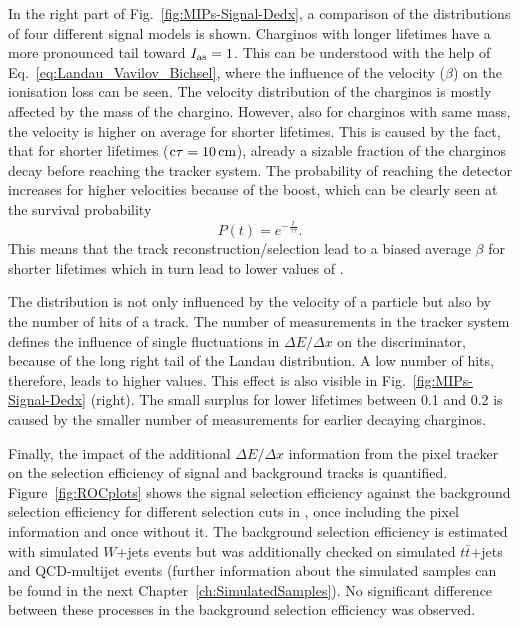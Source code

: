 In the right part of Fig.~\ref{fig:MIPs-Signal-Dedx}, a comparison of the \ias distributions of four different signal models is shown.
Charginos with longer lifetimes have a more pronounced tail toward $I_{\text{as}}=1$.
This can be understood with the help of Eq.~\eqref{eq:Landau_Vavilov_Bichsel}, where the influence of the velocity ($\beta$) on the ionisation loss can be seen.
The velocity distribution of the charginos is mostly affected by the mass of the chargino.
However, also for charginos with same mass, the velocity is higher on average for shorter lifetimes.
This is caused by the fact, that for shorter lifetimes (\eg $\text{c}\tau=10\,\text{cm}$), already a sizable fraction of the charginos decay before reaching the tracker system.
The probability of reaching the detector increases for higher velocities because of the boost, which can be clearly seen at the survival probability
\begin{equation}
P \left( t \right) = e^{-\frac{t}{\gamma \tau}}.
\end{equation} 
This means that the track reconstruction/selection lead to a biased average $\beta$ for shorter lifetimes which in turn lead to lower values of \ias.

The \ias distribution is not only influenced by the velocity of a particle but also by the number of hits of a track.
The number of measurements in the tracker system defines the influence of single fluctuations in $\Delta E/\Delta x$ on the \ias discriminator, because of the long right tail of the Landau distribution.
A low number of hits, therefore, leads to higher \ias values.
This effect is also visible in Fig.~\ref{fig:MIPs-Signal-Dedx} (right). 
The small surplus for lower lifetimes between 0.1 and 0.2 is caused by the smaller number of measurements for earlier decaying charginos.



Finally, the impact of the additional $\Delta E/\Delta x$ information from the pixel tracker on the selection efficiency of signal and background tracks is quantified.
Figure~\ref{fig:ROCplots} shows the signal selection efficiency against the background selection efficiency for different selection cuts in \ias, once including the pixel information and once without it.
The background selection efficiency is estimated with simulated $W$+jets  events but was additionally checked on simulated $t\bar{t}$+jets  and QCD-multijet events 
(further information about the simulated samples can be found in the next Chapter~\ref{ch:SimulatedSamples}).
No significant difference between these processes in the background selection efficiency was observed.

